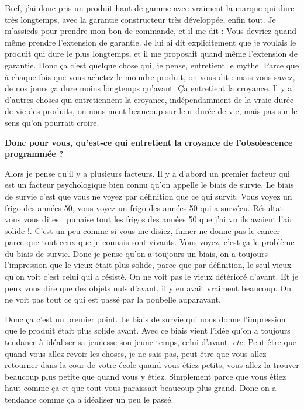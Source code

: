 \begin{small}
Bref, j'ai donc pris un produit haut de gamme avec vraiment la marque qui dure très longtemps, avec la garantie constructeur très développée, enfin tout. Je m'assieds pour prendre mon bon de commande, et il me dit : \og Vous devriez quand même prendre l'extension de garantie\fg{}. Je lui ai dit explicitement que je voulais le produit qui dure le plus longtemps, et il me proposait quand même l'extension de garantie. Donc ça c'est quelque chose qui, je pense, entretient le mythe. Parce que à chaque fois que vous achetez le moindre produit, on vous dit : \og mais vous savez, de nos jours ça dure moins longtemps qu'avant\fg{}. Ça entretient la croyance. Il y a d'autres choses qui entretiennent la croyance, indépendamment de la vraie durée de vie des produits, on nous ment beaucoup sur leur durée de vie, mais pas sur le sens qu'on pourrait croire.

\textbf{Donc pour vous, qu'est-ce qui entretient la croyance de l'obsolescence programmée ?}
\smallbreak


Alors je pense qu'il y a plusieurs facteurs. Il y a d'abord un premier facteur qui est un facteur psychologique bien connu qu'on appelle le biais de survie. Le biais de survie c'est que vous ne voyez par définition que ce qui survit. Vous voyez un frigo des années 50, vous voyez un frigo des années 50 qui a survécu. Résultat vous vous dites : \og punaise tout les frigos des années 50 que j'ai vu ils avaient l'air solide !\fg{}. C'est un peu comme si vous me disiez, fumer ne donne pas le cancer parce que tout ceux que je connais sont vivants. Vous voyez, c'est ça le problème du biais de survie. Donc je pense qu'on a toujours un biais, on a toujours l'impression que le vieux était plus solide, parce que par définition, le seul vieux qu'on voit c'est celui qui a résisté. On ne voit pas le vieux détérioré d'avant. Et je peux vous dire que des objets nuls d'avant, il y en avait vraiment beaucoup. On ne voit pas tout ce qui est passé par la poubelle auparavant.

Donc ça c'est un premier point. Le biais de survie qui nous donne l'impression que le produit était plus solide avant. Avec ce biais vient l'idée qu'on a toujours tendance à idéaliser sa jeunesse son jeune temps, celui d'avant, \textit{etc.} Peut-être que quand vous allez revoir les choses, je ne sais pas, peut-être que vous allez retourner dans la cour de votre école quand vous étiez petits, vous allez la trouver beaucoup plus petite que quand vous y étiez. Simplement parce que vous étiez haut comme ça et que tout vous paraissait beaucoup plus grand. Donc on a tendance comme ça a idéaliser un peu le passé.


\end{small}

